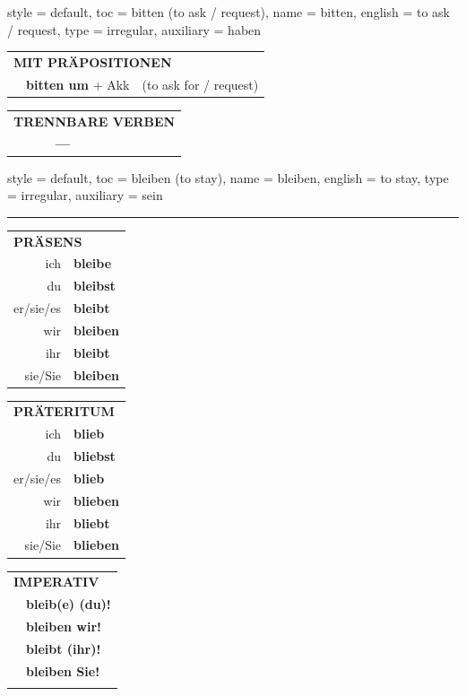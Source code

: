 \begin{verbentry}{
  style = {default},
  toc = {bitten (to ask / request)},
  name = {bitten},
  english = {to ask / request},
  type = {irregular},
  auxiliary = {haben}
}
\vspace{10pt}

\begin{tabular}{lll}
\multicolumn{3}{l}{\textbf{MIT PRÄPOSITIONEN}}\\
& \textbf{bitten um} + Akk & (to ask for / request)\\
\end{tabular}
\hfill
\begin{tabular}{lll}
\multicolumn{3}{l}{\textbf{TRENNBARE VERBEN}}\\
& \textbf{---} & \\
\end{tabular}
\vspace{-5pt}
\end{verbentry}

\begin{verbentry}{
  style = {default},
  toc = {bleiben (to stay)},
  name = {bleiben},
  english = {to stay},
  type = {irregular},
  auxiliary = {sein}
}
 
    
     \vspace{5pt}

    \hrule
    
    \vspace{5pt}

  \begin{tabular}{rl}
     \multicolumn{2}{l}{\textbf{PRÄSENS} }\\
    ich & \textbf{bleibe}\\
    du & \textbf{bleibst}\\
    er/sie/es & \textbf{bleibt}\\
    wir & \textbf{bleiben}\\
    ihr & \textbf{bleibt}\\
    sie/Sie & \textbf{bleiben}\\
  \end{tabular}
  \hfill
     \begin{tabular}{rl}
    \multicolumn{2}{l}{\textbf{PRÄTERITUM} }\\
    ich & \textbf{blieb}\\
    du & \textbf{bliebst}\\
    er/sie/es & \textbf{blieb}\\
    wir & \textbf{blieben}\\
    ihr & \textbf{bliebt}\\
    sie/Sie & \textbf{blieben}\\
  \end{tabular}
  \hfill
  \begin{tabular}{rl}
     \multicolumn{2}{l}{\textbf{IMPERATIV} }\\
   & \textbf{bleib(e) (du)!}\\
   & \textbf{bleiben wir!}\\
   & \textbf{bleibt (ihr)!}\\
   & \textbf{bleiben Sie!}\\
   & \vspace{10pt}
  \end{tabular}


\end{verbentry}
